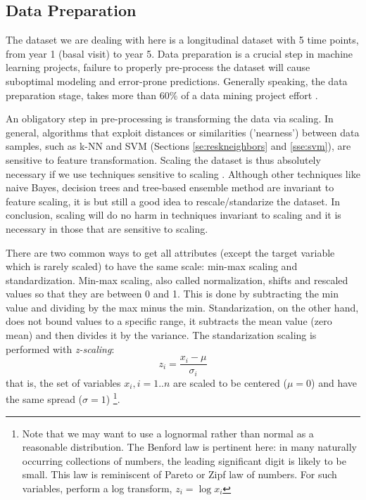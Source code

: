 \documentclass[11pt]{article}
\theoremstyle{definition}
\theoremstyle{remark}
\begin{document}
\subsection{Data Preparation} 
\label{sse:dp}
  
The dataset we are dealing with here is a longitudinal dataset with 5 time points, from year 1 (basal visit) to year 5.
Data preparation is a crucial step in machine learning projects, failure to properly pre-process the dataset will cause suboptimal modeling and error-prone predictions.
Generally speaking, the data preparation stage, takes more than $60\%$ of a data mining project effort \cite{witten2005data}.

An obligatory step in pre-processing is transforming the data via scaling. 
In general, algorithms that exploit distances or similarities ('nearness') between data samples, such as k-NN and SVM (Sections \ref{se:reskneighbors} and \ref{sse:svm}), are sensitive to feature transformation. 
Scaling the dataset is thus absolutely necessary if we use techniques sensitive to scaling \cite{wu2012foundations}. Although other techniques like naive Bayes, decision trees and tree-based ensemble method are invariant to feature scaling, it is but still a good idea to rescale/standarize the dataset. In conclusion, scaling will do no harm in techniques invariant to scaling and it is necessary in those that are sensitive to scaling. 

There are two common ways to get all attributes (except the target variable which is rarely scaled) to have the same scale: min-max scaling and standardization.
Min-max scaling, also called normalization, shifts and rescaled values so that they are between 0 and 1. This is done by subtracting the min value and dividing by the max minus the min. 
Standarization, on the other hand, does not bound values to a specific range, it subtracts the mean value (zero mean) and then divides it by the variance. 
The standarization scaling is performed with \emph{z-scaling}:
\begin{equation} \label{eq:scaling}
z_i = \frac{x_i -\mu}{\sigma_i}
\end{equation}
that is, the set of variables $x_i, i=1..n$ are scaled to be centered ($\mu=0$) and have the same spread ($\sigma=1$) \footnote{Note that we may want to use a lognormal rather than normal as a reasonable distribution. The Benford law is pertinent here: in many naturally occurring collections of numbers, the leading significant digit is likely to be small. This law is reminiscent of Pareto or Zipf law of numbers. For such variables, perform a log transform, $z_i = \log x_i$}. 
\end{document}
